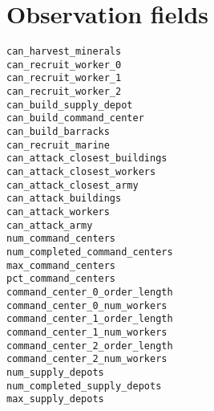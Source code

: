 \chapter{Observation fields}
\label{app:observation}

\begin{description}
    \item[\texttt{can\_harvest\_minerals}] 
    \item[\texttt{can\_recruit\_worker\_0}] 
    \item[\texttt{can\_recruit\_worker\_1}] 
    \item[\texttt{can\_recruit\_worker\_2}] 
    \item[\texttt{can\_build\_supply\_depot}] 
    \item[\texttt{can\_build\_command\_center}] 
    \item[\texttt{can\_build\_barracks}] 
    \item[\texttt{can\_recruit\_marine}] 
    \item[\texttt{can\_attack\_closest\_buildings}] 
    \item[\texttt{can\_attack\_closest\_workers}] 
    \item[\texttt{can\_attack\_closest\_army}] 
    \item[\texttt{can\_attack\_buildings}] 
    \item[\texttt{can\_attack\_workers}] 
    \item[\texttt{can\_attack\_army}] 
    \item[\texttt{num\_command\_centers}] 
    \item[\texttt{num\_completed\_command\_centers}] 
    \item[\texttt{max\_command\_centers}] 
    \item[\texttt{pct\_command\_centers}] 
    \item[\texttt{command\_center\_0\_order\_length}] 
    \item[\texttt{command\_center\_0\_num\_workers}] 
    \item[\texttt{command\_center\_1\_order\_length}] 
    \item[\texttt{command\_center\_1\_num\_workers}] 
    \item[\texttt{command\_center\_2\_order\_length}] 
    \item[\texttt{command\_center\_2\_num\_workers}] 
    \item[\texttt{num\_supply\_depots}] 
    \item[\texttt{num\_completed\_supply\_depots}] 
    \item[\texttt{max\_supply\_depots}] 

\end{description}
